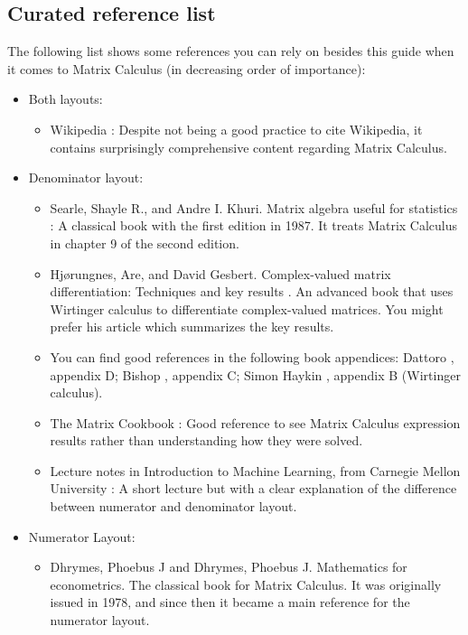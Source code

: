 \subsection{Curated reference list}
The following list shows some references you can rely on besides this guide when it comes to Matrix Calculus (in decreasing order of importance):
\begin{itemize}
    \item Both layouts:
    \begin{itemize}
	    \item Wikipedia \cite{Matrixca44:online}: Despite not being a good practice to cite Wikipedia, it contains surprisingly comprehensive content regarding Matrix Calculus.
    \end{itemize}
	\item Denominator layout:
    \begin{itemize}
        \item Searle, Shayle R., and Andre I. Khuri. Matrix algebra useful for statistics \cite{searle2017matrix}: A classical book with the first edition in 1987. It treats Matrix Calculus in chapter 9 of the second edition.
        \item Hj\o rungnes, Are, and David Gesbert. Complex-valued matrix differentiation: Techniques and key results \cite{hjorungnes2011complex}. An advanced book that uses Wirtinger calculus to differentiate complex-valued matrices. You might prefer his article \cite{hjorungnes2007complex} which summarizes the key results.
        \item You can find good references in the following book appendices: Dattoro \cite{dattorroConvexOptimizationEuclidean2010}, appendix D; Bishop \cite{bishopPatternRecognitionMachine2006}, appendix C; Simon Haykin \cite{haykin2009neural}, appendix B (Wirtinger calculus).
        \item The Matrix Cookbook \cite{petersen2008matrix}: Good reference to see Matrix Calculus expression results rather than understanding how they were solved.
        \item Lecture notes in Introduction to Machine Learning, from Carnegie Mellon University \cite{Singh}: A short lecture but with a clear explanation of the difference between numerator and denominator layout.
    \end{itemize}
    \item Numerator Layout:
    \begin{itemize}
        \item Dhrymes, Phoebus J and Dhrymes, Phoebus J. Mathematics for econometrics. The classical book for Matrix Calculus. It was originally issued in 1978, and since then it became a main reference for the numerator layout.

\end{itemize}
\end{itemize}
